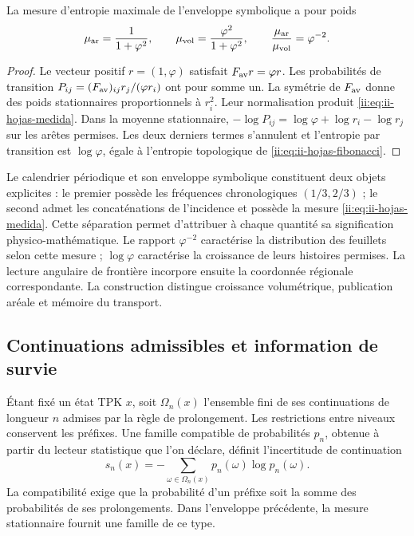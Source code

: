 \begin{proposition}
La mesure d'entropie maximale de l'enveloppe symbolique a pour poids
\begin{equation}
 \mu_{\rm ar}=\frac{1}{1+\varphi^2},\qquad
 \mu_{\rm vol}=\frac{\varphi^2}{1+\varphi^2},\qquad
 \frac{\mu_{\rm ar}}{\mu_{\rm vol}}=\varphi^{-2}.
 \label{ii:eq:ii-hojas-medida}
\end{equation}
\end{proposition}
\begin{proof}
Le vecteur positif \(r=(1,\varphi)\) satisfait
\(F_{\rm av}r=\varphi r\). Les probabilités de transition
\(P_{ij}=(F_{\rm av})_{ij}r_j/(\varphi r_i)\) ont pour somme un.
La symétrie de \(F_{\rm av}\) donne des poids stationnaires proportionnels
à \(r_i^2\). Leur normalisation produit
\eqref{ii:eq:ii-hojas-medida}. Dans la moyenne stationnaire,
\(-\log P_{ij}=\log\varphi+\log r_i-\log r_j\) sur les
arêtes permises. Les deux derniers termes s'annulent et
l'entropie par transition est \(\log\varphi\), égale à l'entropie
topologique de \eqref{ii:eq:ii-hojas-fibonacci}.
\end{proof}

Le calendrier périodique et son enveloppe symbolique constituent deux
objets explicites : le premier possède les fréquences chronologiques
\((1/3,2/3)\) ; le second admet les concaténations de l'incidence
et possède la mesure \eqref{ii:eq:ii-hojas-medida}. Cette séparation permet
d'attribuer à chaque quantité sa signification physico-mathématique. Le rapport
\(\varphi^{-2}\) caractérise la distribution des feuillets selon cette
mesure ; \(\log\varphi\) caractérise la croissance de leurs histoires
permises. La lecture angulaire de frontière incorpore ensuite la
coordonnée régionale correspondante. La construction distingue
croissance volumétrique, publication aréale et mémoire du transport.

\subsection{Continuations admissibles et information de survie}
\label{ii:sec:ii-informacion-supervivencia}

Étant fixé un état TPK \(x\), soit \(\Omega_n(x)\) l'ensemble fini
de ses continuations de longueur \(n\) admises par la règle de
prolongement. Les restrictions entre niveaux conservent les préfixes.
Une famille compatible de probabilités \(p_n\), obtenue à partir du
lecteur statistique que l'on déclare, définit l'incertitude de
continuation
\begin{equation}
 s_n(x)=-\sum_{\omega\in\Omega_n(x)}
                 p_n(\omega)\log p_n(\omega).
 \label{ii:eq:ii-entropia-continuaciones}
\end{equation}
La compatibilité exige que la probabilité d'un préfixe soit la somme
des probabilités de ses prolongements. Dans l'enveloppe précédente,
la mesure stationnaire fournit une famille de ce type.

